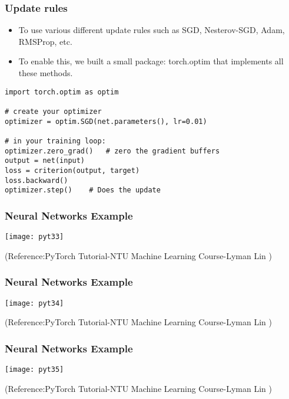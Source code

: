 \begin{frame}[fragile] \frametitle{Update rules}
\begin{itemize}
\item To use various different update rules such as SGD, Nesterov-SGD, Adam, RMSProp, etc. 
\item To enable this, we built a small package: torch.optim that implements all these methods. 
\end{itemize}
\begin{lstlisting}
import torch.optim as optim

# create your optimizer
optimizer = optim.SGD(net.parameters(), lr=0.01)

# in your training loop:
optimizer.zero_grad()   # zero the gradient buffers
output = net(input)
loss = criterion(output, target)
loss.backward()
optimizer.step()    # Does the update
\end{lstlisting}

\end{frame}


\begin{frame}[fragile] \frametitle{Neural Networks Example}
\begin{center}
\texttt{[image: pyt33]}
\end{center}
\tiny{(Reference:PyTorch Tutorial-NTU Machine Learning Course-Lyman Lin )}
\end{frame}

\begin{frame}[fragile] \frametitle{Neural Networks Example}
\begin{center}
\texttt{[image: pyt34]}
\end{center}
\tiny{(Reference:PyTorch Tutorial-NTU Machine Learning Course-Lyman Lin )}
\end{frame}

\begin{frame}[fragile] \frametitle{Neural Networks Example}
\begin{center}
\texttt{[image: pyt35]}
\end{center}
\tiny{(Reference:PyTorch Tutorial-NTU Machine Learning Course-Lyman Lin )}
\end{frame}

